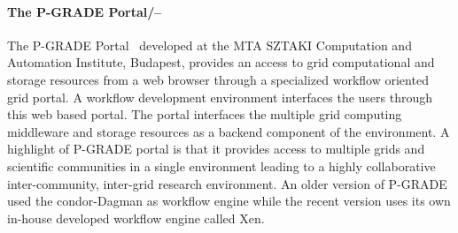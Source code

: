 \paragraph{The P-GRADE Portal/--} The P-GRADE Portal~\cite{pgrade2011}
developed at the MTA SZTAKI Computation and Automation Institute, Budapest,
provides an access to grid computational and storage resources from a web
browser through a specialized workflow oriented grid portal. A workflow
development environment interfaces the users through this web based portal. The
portal interfaces the multiple grid computing middleware and storage resources
as a backend component of the environment. A highlight of P-GRADE portal is
that it provides access to multiple grids and scientific communities in a
single environment leading to a highly collaborative inter-community,
inter-grid research environment. An older version of P-GRADE used the
condor-Dagman as workflow engine while the recent version uses its own in-house
developed workflow engine called Xen.  
